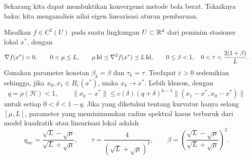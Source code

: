 Sekarang kita dapat membuktikan konvergensi metode bola berat. Tekniknya baku: kita menganalisis nilai eigen linearisasi aturan pembaruan.

\begin{theorem}
    Misalkan \(f\in C^2(U)\) pada suatu lingkungan \(U\subset\mathbb{R}^d\) dari peminim stasioner lokal \(x^*\), dengan
    \begin{equation}
        \nabla f(x^*)=0,\qquad
        0<\mu\leq L,\qquad
        \mu\operatorname{\mathrm{Id}}\preceq\nabla^2f(x^*)\preceq L\operatorname{\mathrm{Id}},
        \qquad 0\leq\beta<1,\quad
        0<\tau<\frac{2(1+\beta)}{L}.
    \end{equation}
    Gunakan parameter konstan \(\beta_k=\beta\) dan \(\tau_k=\tau\). Terdapat \(\varepsilon>0\) sedemikian sehingga, jika \(x_0,x_1\in B_\varepsilon(x^*)\), maka \(x_k\rightarrow x^*\). Lebih khusus, dengan
    \begin{equation}
        q=\rho(\mathcal{H})<1,\qquad
        \|x_k-x^*\|\leq
        c(\delta)(q+\delta)^{k-1}
        \|(x_1-x^*,x_0-x^*)\|
    \end{equation}
    untuk setiap \(0<\delta<1-q\). Jika yang diketahui tentang kurvatur hanya selang \([\mu,L]\), parameter yang meminimumkan radius spektral kasus terburuk dari model kuadratik atau linearisasi lokal adalah
    \begin{equation}
        q_{\mathrm{wc}}=
        \frac{\sqrt{L}-\sqrt{\mu}}{\sqrt{L}+\sqrt{\mu}},
        \qquad
        \tau=\frac{4}{(\sqrt{L}+\sqrt{\mu})^2},
        \qquad
        \beta=
        \left(\frac{\sqrt{L}-\sqrt{\mu}}
        {\sqrt{L}+\sqrt{\mu}}\right)^2.
    \end{equation}
\end{theorem}

